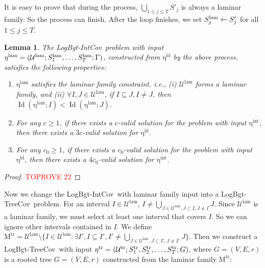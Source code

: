 \documentclass[11pt,a4paper]{article} \usepackage{enumitem}
\newcommand{\calU}{\mathcal{U}}
\newcommand{\LBOintcov}{\textsf{LogBgt-IntCov}}
\newcommand{\LBOtreecov}{\textsf{LogBgt-TreeCov}}
\newcommand{\trU}{\operatorname{\calU^{tr}}}
\newcommand{\trS}[1]{\ifx\relax#1\relax
    S^{\operatorname{tr}} \else
    S^{\operatorname{tr}}_{#1} \fi
}
\newcommand{\treta}{\operatorname{\eta^{tr}}}
\newcommand{\inteta}{\operatorname{\eta^{int}}}
\newcommand{\ldeta}{\operatorname{\eta^{ld}}}
\newcommand{\trM}{\operatorname{M^{tr}}}
\newcommand{\lamU}{\operatorname{\calU^{lam}}}
\newcommand{\lamS}[1]{\ifx\relax#1\relax
    S^{\operatorname{lam}}
  \else
    S^{\operatorname{lam}}_{#1} 
  \fi
}
\newcommand{\lameta}{\operatorname{\eta^{lam}}}
\newcommand{\Lev}{\operatorname{Id}}
\newtheorem{lemma}[theorem]{Lemma}
\theoremstyle{definition}
\begin{document}
It is easy to prove that during the process, $\bigcup_{1 \leq j \leq T} S'_j$ is always a laminar family. So the process can finish.
After the loop finishes, we set $\lamS{j} \gets S'_j$ for all $1 \leq j \leq T$.

\begin{lemma}\label{lem:inter-convert-2}
The \LBOintcov\ problem with input $\lameta = (\lamU; \lamS{1}, \ldots, \lamS{T}; \Gamma)$, constructed from $\ldeta$ by the above process, satisfies the following properties:

\begin{enumerate}[label=(\alph*), format=\normalfont]
\item $\lameta$ satisfies the laminar family constraint. i.e., (i) $\lamU$ forms a laminar family, and (ii) $\forall I, J \in \lamU$, if $I \subseteq J,I\neq J$, then $\Lev(\lameta; I) < \Lev(\lameta; J)$.

\item For any $c \geq 1$, if there exists a $c$-valid solution for the problem with input $\inteta$, then there exists a $3c$-valid solution for $\ldeta$. 

\item For any $c_0 \geq 1$, if there exists a $c_0$-valid solution for the problem with input $\ldeta$, then there exists a $4c_0$-valid solution for $\inteta$.
\end{enumerate}
\end{lemma}
\begin{proof}\textcolor{red}{TOPROVE 22}\end{proof}


Now we change the \LBOintcov\ with laminar family input into a \LBOtreecov\ problem.
For an interval $I\in \lamU$, $I\not =\bigcup_{J\in \lamU, J\subset I,J\not =I} J$. Since $\lamU$ is a laminar family, we must select at least one interval that covers $I$. So we can ignore other intervals contained in $I$.
We define
$\trM = \lamU\setminus \{I \in \lamU: \exists I', I\subseteq I', I' \neq \bigcup_{J \in \lamU, J \subset I', J\not =I'} J\}$.   
Then we construct a \LBOtreecov\ with input $\treta=(\trU; \trS{1}, \trS{2}, \ldots, \trS{T}; G)$, where $G=(V,E,r)$ is a rooted tree $G=(V,E,r)$ constructed from the laminar family $\trM$:
\end{document}
